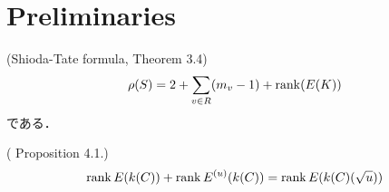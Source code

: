 \documentclass[main]{subfiles}
\begin{document}
\chapter{Preliminaries}

\begin{thm}{(Shioda-Tate formula, \cite{ref:naskrecki2013} Theorem 3.4)}
    \label{thm:shioda}
    \begin{equation}
        \rho (S) = 2 + \sum_{v \in R} (m_{v} - 1) + \operatorname{rank}(E(K))
    \end{equation}
    である．
\end{thm}

\begin{thm}{(\cite{ref:naskrecki2013} Proposition 4.1.)}
    \begin{equation}
        \operatorname{rank} E(k(C)) + \operatorname{rank} E^{(u)}(k(C)) = \operatorname{rank} E(k(C)(\sqrt{u}))
    \end{equation}
\end{thm}
\end{document}
